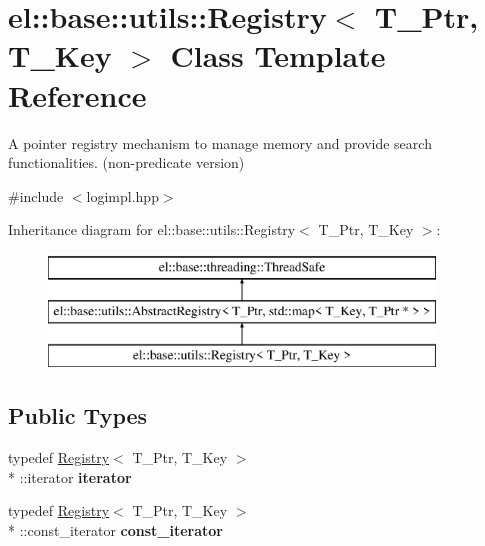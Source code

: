 \hypertarget{classel_1_1base_1_1utils_1_1Registry}{\section{el\-:\-:base\-:\-:utils\-:\-:Registry$<$ T\-\_\-\-Ptr, T\-\_\-\-Key $>$ Class Template Reference}
\label{classel_1_1base_1_1utils_1_1Registry}
}


A pointer registry mechanism to manage memory and provide search functionalities. (non-\/predicate version)  




{\ttfamily \#include $<$logimpl.\-hpp$>$}

Inheritance diagram for el\-:\-:base\-:\-:utils\-:\-:Registry$<$ T\-\_\-\-Ptr, T\-\_\-\-Key $>$\-:\begin{figure}[H]
\begin{center}
\leavevmode
\includegraphics[height=3.000000cm]{classel_1_1base_1_1utils_1_1Registry}
\end{center}
\end{figure}
\subsection*{Public Types}
\begin{DoxyCompactItemize}
\item 
\hypertarget{classel_1_1base_1_1utils_1_1Registry_a31f3d725285e6b65f1f9e990066f96ed}{typedef \hyperlink{classel_1_1base_1_1utils_1_1Registry}{Registry}$<$ T\-\_\-\-Ptr, T\-\_\-\-Key $>$\\*
\-::iterator {\bfseries iterator}}\label{classel_1_1base_1_1utils_1_1Registry_a31f3d725285e6b65f1f9e990066f96ed}

\item 
\hypertarget{classel_1_1base_1_1utils_1_1Registry_a955e62adc74c60d0205b52a3fc430cef}{typedef \hyperlink{classel_1_1base_1_1utils_1_1Registry}{Registry}$<$ T\-\_\-\-Ptr, T\-\_\-\-Key $>$\\*
\-::const\-\_\-iterator {\bfseries const\-\_\-iterator}}\label{classel_1_1base_1_1utils_1_1Registry_a955e62adc74c60d0205b52a3fc430cef}

\end{DoxyCompactItemize}
